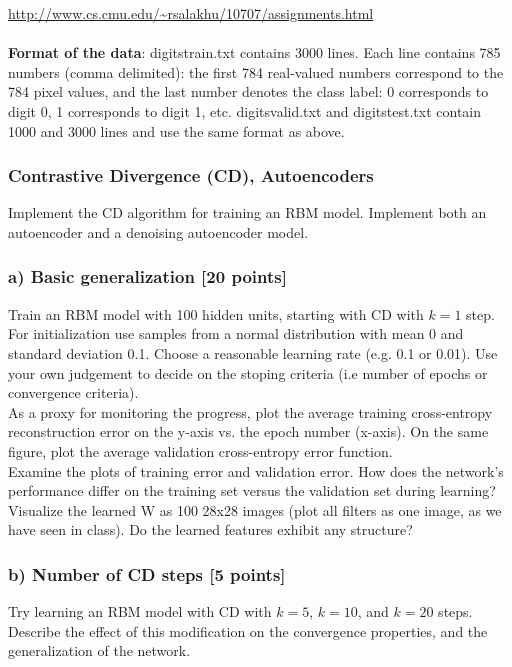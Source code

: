 \documentclass[10pt]{article}
\begin{document}
\url{http://www.cs.cmu.edu/~rsalakhu/10707/assignments.html}
\\
\\

{\bf Format of the data}: digitstrain.txt contains 3000 lines.
Each line contains 785 numbers (comma delimited):
the first 784 real-valued numbers
correspond to the
784 pixel values, and the last number denotes
the class label: 0 corresponds to digit 0, 1 corresponds to digit 1, etc.
digitsvalid.txt and digitstest.txt contain 1000 and 3000 lines
and use the same format as above.


\subsubsection*{Contrastive Divergence (CD), Autoencoders}
Implement the CD algorithm for training an RBM model.
Implement both an autoencoder and a denoising autoencoder model. 


\subsubsection*{a) Basic generalization [20 points]}
Train an RBM model with 100 hidden units, starting with CD with $k = 1$ step. For initialization use samples from a normal distribution with mean 0 and standard deviation 0.1. Choose a reasonable 
learning rate (e.g. 0.1 or 0.01). Use your own judgement to decide on the stoping criteria (i.e number of epochs or convergence criteria). 
\\

As a proxy for monitoring the progress, 
plot the average training cross-entropy reconstruction error
on the y-axis vs. the epoch number (x-axis). 
On the same figure, plot the average validation cross-entropy error function.
\\
 
Examine the plots of training error and validation error.
How does the network's performance differ on the training set versus the validation set
during learning? 
Visualize the learned W as 100 28x28 images
(plot all filters as one image, as we have seen in class).
Do the learned features exhibit any structure? 

\subsubsection*{b) Number of CD steps [5 points]}
Try learning an RBM model with CD with $k = 5$, $k = 10$, and $k = 20$ steps.
Describe the effect of this modification on the convergence properties, and the
generalization of the network.
\end{document}
